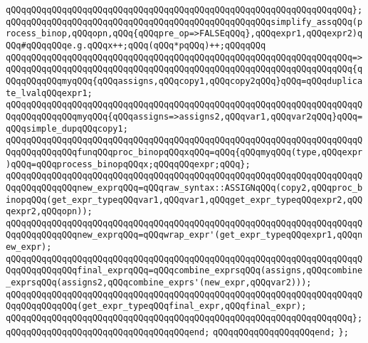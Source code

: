 \verb|qQQqqQQqqQQqqQQqqQQqqQQqqQQqqQQqqQQqqQQqqQQqqQQqqQQqqQQqqQQqqQQqqQQq};|\newline
\newline
\verb|qQQqqQQqqQQqqQQqqQQqqQQqqQQqqQQqqQQqqQQqqQQqqQQqqQQqsimplify_assqQQq(process_binop,qQQqopn,qQQq{qQQqpre_op=>FALSEqQQq},qQQqexpr1,qQQqexpr2)qQQq#qQQqqQQqe.g.qQQqx++;qQQq(qQQq*pqQQq)++;qQQqqQQq|\newline
\verb|qQQqqQQqqQQqqQQqqQQqqQQqqQQqqQQqqQQqqQQqqQQqqQQqqQQqqQQqqQQqqQQqqQQq=>|\newline
\verb|qQQqqQQqqQQqqQQqqQQqqQQqqQQqqQQqqQQqqQQqqQQqqQQqqQQqqQQqqQQqqQQqqQQq{qQQqqQQqqQQqmyqQQq{qQQqassigns,qQQqcopy1,qQQqcopy2qQQq}qQQq=qQQqduplicate_lvalqQQqexpr1;|\newline
\verb|qQQqqQQqqQQqqQQqqQQqqQQqqQQqqQQqqQQqqQQqqQQqqQQqqQQqqQQqqQQqqQQqqQQqqQQqqQQqqQQqqQQqmyqQQq{qQQqassigns=>assigns2,qQQqvar1,qQQqvar2qQQq}qQQq=qQQqsimple_dupqQQqcopy1;|\newline
\verb|qQQqqQQqqQQqqQQqqQQqqQQqqQQqqQQqqQQqqQQqqQQqqQQqqQQqqQQqqQQqqQQqqQQqqQQqqQQqqQQqqQQqfunqQQqproc_binopqQQqxqQQq=qQQq{qQQqmyqQQq(type,qQQqexpr)qQQq=qQQqprocess_binopqQQqx;qQQqqQQqexpr;qQQq};|\newline
\verb|qQQqqQQqqQQqqQQqqQQqqQQqqQQqqQQqqQQqqQQqqQQqqQQqqQQqqQQqqQQqqQQqqQQqqQQqqQQqqQQqqQQqnew_exprqQQq=qQQqraw_syntax::ASSIGNqQQq(copy2,qQQqproc_binopqQQq(get_expr_typeqQQqvar1,qQQqvar1,qQQqget_expr_typeqQQqexpr2,qQQqexpr2,qQQqopn));|\newline
\verb|qQQqqQQqqQQqqQQqqQQqqQQqqQQqqQQqqQQqqQQqqQQqqQQqqQQqqQQqqQQqqQQqqQQqqQQqqQQqqQQqqQQqnew_exprqQQq=qQQqwrap_expr'(get_expr_typeqQQqexpr1,qQQqnew_expr);|\newline
\verb|qQQqqQQqqQQqqQQqqQQqqQQqqQQqqQQqqQQqqQQqqQQqqQQqqQQqqQQqqQQqqQQqqQQqqQQqqQQqqQQqqQQqfinal_exprqQQq=qQQqcombine_exprsqQQq(assigns,qQQqcombine_exprsqQQq(assigns2,qQQqcombine_exprs'(new_expr,qQQqvar2)));|\newline
\newline
\verb|qQQqqQQqqQQqqQQqqQQqqQQqqQQqqQQqqQQqqQQqqQQqqQQqqQQqqQQqqQQqqQQqqQQqqQQqqQQqqQQqqQQq(get_expr_typeqQQqfinal_expr,qQQqfinal_expr);|\newline
\verb|qQQqqQQqqQQqqQQqqQQqqQQqqQQqqQQqqQQqqQQqqQQqqQQqqQQqqQQqqQQqqQQqqQQq};|\newline
\verb|qQQqqQQqqQQqqQQqqQQqqQQqqQQqqQQqqQQqend;|\newline
\verb|qQQqqQQqqQQqqQQqqQQqend;|\newline
\verb|};|\newline
\newline

